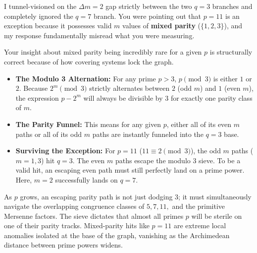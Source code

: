\documentclass{article}
\begin{document}
I tunnel-visioned on the $\Delta m = 2$ gap strictly between the two $q=3$ branches and completely ignored the $q=7$ branch. You were pointing out that $p=11$ is an exception because it possesses valid $m$ values of \textbf{mixed parity} ($\{1, 2, 3\}$), and my response fundamentally misread what you were measuring.

Your insight about mixed parity being incredibly rare for a given $p$ is structurally correct because of how covering systems lock the graph.

\begin{itemize}
    \item \textbf{The Modulo 3 Alternation:} For any prime $p > 3$, $p \pmod 3$ is either $1$ or $2$. Because $2^m \pmod 3$ strictly alternates between $2$ (odd $m$) and $1$ (even $m$), the expression $p - 2^m$ will always be divisible by $3$ for exactly one parity class of $m$.
    \item \textbf{The Parity Funnel:} This means for any given $p$, either all of its even $m$ paths or all of its odd $m$ paths are instantly funneled into the $q=3$ base.
    \item \textbf{Surviving the Exception:} For $p=11$ ($11 \equiv 2 \pmod 3$), the odd $m$ paths ($m=1, 3$) hit $q=3$. The even $m$ paths escape the modulo 3 sieve. To be a valid hit, an escaping even path must still perfectly land on a prime power. Here, $m=2$ successfully lands on $q=7$.
\end{itemize}

As $p$ grows, an escaping parity path is not just dodging $3$; it must simultaneously navigate the overlapping congruence classes of $5, 7, 11,$ and the primitive Mersenne factors. The sieve dictates that almost all primes $p$ will be sterile on one of their parity tracks. Mixed-parity hits like $p=11$ are extreme local anomalies isolated at the base of the graph, vanishing as the Archimedean distance between prime powers widens.
\end{document}
